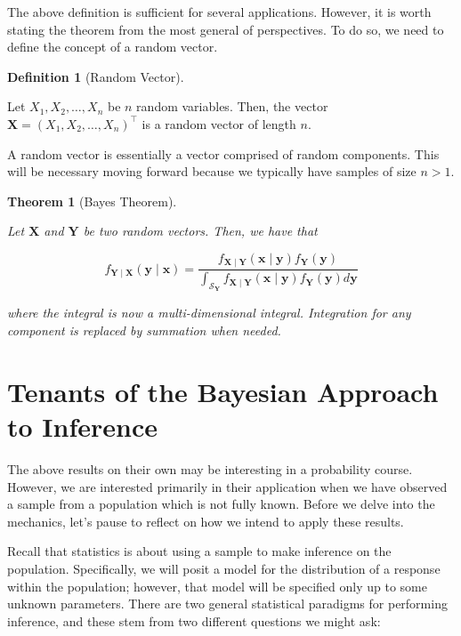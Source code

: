 \documentclass[
  letterpaper,
  DIV=11,
  numbers=noendperiod]{scrreprt}
\theoremstyle{definition}
\theoremstyle{definition}
\newtheorem{definition}{Definition}[chapter]
\theoremstyle{plain}
\newtheorem{theorem}{Theorem}[chapter]
\theoremstyle{remark}
\begin{document}
The above definition is sufficient for several applications. However, it
is worth stating the theorem from the most general of perspectives. To
do so, we need to define the concept of a random vector.

\begin{definition}[Random
Vector]\protect\hypertarget{def-random-vector}{}\label{def-random-vector}

Let \(X_1, X_2, \dots, X_n\) be \(n\) random variables. Then, the vector
\(\mathbf{X} = \left(X_1, X_2, \dots, X_n\right)^\top\) is a random
vector of length \(n\).

\end{definition}

A random vector is essentially a vector comprised of random components.
This will be necessary moving forward because we typically have samples
of size \(n > 1\).

\begin{theorem}[Bayes
Theorem]\protect\hypertarget{thm-bayes-rule}{}\label{thm-bayes-rule}

Let \(\mathbf{X}\) and \(\mathbf{Y}\) be two random \emph{vectors}.
Then, we have that

\[f_{\mathbf{Y} \mid \mathbf{X}}(\mathbf{y} \mid \mathbf{x}) = \frac{f_{\mathbf{X} \mid \mathbf{Y}}(\mathbf{x} \mid \mathbf{y}) f_{\mathbf{Y}}(\mathbf{y})}{\int_{\mathcal{S}_\mathbf{Y}} f_{\mathbf{X} \mid \mathbf{Y}}(\mathbf{x} \mid \mathbf{y}) f_{\mathbf{Y}}(\mathbf{y}) d\mathbf{y}}\]

where the integral is now a multi-dimensional integral. Integration for
any component is replaced by summation when needed.

\end{theorem}

\hypertarget{tenants-of-the-bayesian-approach-to-inference}{%
\section{Tenants of the Bayesian Approach to
Inference}\label{tenants-of-the-bayesian-approach-to-inference}}

The above results on their own may be interesting in a probability
course. However, we are interested primarily in their application when
we have observed a sample from a population which is not fully known.
Before we delve into the mechanics, let's pause to reflect on how we
intend to apply these results.

Recall that statistics is about using a sample to make inference on the
population. Specifically, we will posit a model for the distribution of
a response within the population; however, that model will be specified
only up to some unknown parameters. There are two general statistical
paradigms for performing inference, and these stem from two different
questions we might ask:
\end{document}
